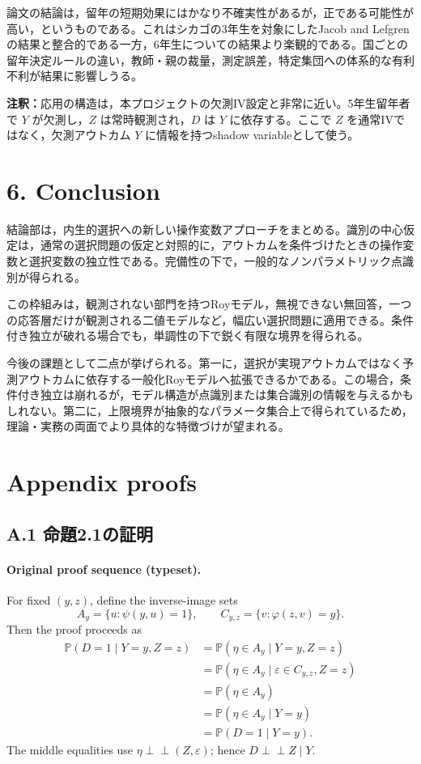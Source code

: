 \documentclass[10pt,a4paper]{article}
\newcommand{\indep}{\mathrel{\perp\!\!\!\perp}}
\newcommand{\Prb}{\mathbb{P}}
\newcommand{\note}[1]{\par\smallskip\noindent\textbf{注釈：}#1\par\smallskip}
\begin{document}
論文の結論は，留年の短期効果にはかなり不確実性があるが，正である可能性が高い，というものである。これはシカゴの3年生を対象にしたJacob and Lefgrenの結果と整合的である一方，6年生についての結果より楽観的である。国ごとの留年決定ルールの違い，教師・親の裁量，測定誤差，特定集団への体系的な有利不利が結果に影響しうる。

\note{応用の構造は，本プロジェクトの欠測IV設定と非常に近い。5年生留年者で $Y$ が欠測し，$Z$ は常時観測され，$D$ は $Y$ に依存する。ここで $Z$ を通常IVではなく，欠測アウトカム $Y$ に情報を持つshadow variableとして使う。}

\section{6. Conclusion}

結論部は，内生的選択への新しい操作変数アプローチをまとめる。識別の中心仮定は，通常の選択問題の仮定と対照的に，アウトカムを条件づけたときの操作変数と選択変数の独立性である。完備性の下で，一般的なノンパラメトリック点識別が得られる。

この枠組みは，観測されない部門を持つRoyモデル，無視できない無回答，一つの応答層だけが観測される二値モデルなど，幅広い選択問題に適用できる。条件付き独立が破れる場合でも，単調性の下で鋭く有限な境界を得られる。

今後の課題として二点が挙げられる。第一に，選択が実現アウトカムではなく予測アウトカムに依存する一般化Royモデルへ拡張できるかである。この場合，条件付き独立は崩れるが，モデル構造が点識別または集合識別の情報を与えるかもしれない。第二に，上限境界が抽象的なパラメータ集合上で得られているため，理論・実務の両面でより具体的な特徴づけが望まれる。

\section{Appendix proofs}

\subsection*{A.1 命題2.1の証明}

\paragraph{Original proof sequence (typeset).}
For fixed $(y,z)$, define the inverse-image sets
\[
 A_y=\{u:\psi(y,u)=1\},
 \qquad
 C_{y,z}=\{v:\varphi(z,v)=y\}.
\]
Then the proof proceeds as
\begin{align*}
 \Prb(D=1\mid Y=y,Z=z)
 &=\Prb(\eta\in A_y\mid Y=y,Z=z)\\
 &=\Prb(\eta\in A_y\mid \varepsilon\in C_{y,z},Z=z)\\
 &=\Prb(\eta\in A_y)\\
 &=\Prb(\eta\in A_y\mid Y=y)\\
 &=\Prb(D=1\mid Y=y).
\end{align*}
The middle equalities use $\eta\indep(Z,\varepsilon)$; hence
$D\indep Z\mid Y$.
\end{document}
